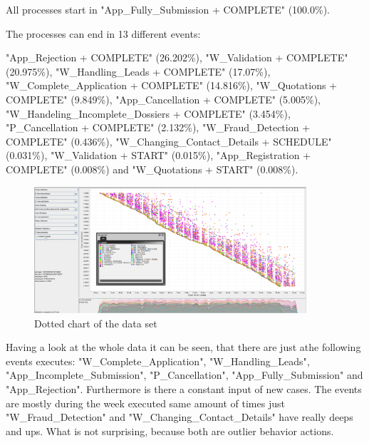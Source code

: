 All processes start in "App\_Fully\_Submission + COMPLETE" (100.0\%).

The processes can end in 13 different events:

"App\_Rejection + COMPLETE" (26.202\%), "W\_Validation + COMPLETE" (20.975\%), "W\_Handling\_Leads + COMPLETE" (17.07\%), "W\_Complete\_Application + COMPLETE" (14.816\%), "W\_Quotations + COMPLETE" (9.849\%), "App\_Cancellation + COMPLETE" (5.005\%), "W\_Handeling\_Incomplete\_Dossiers + COMPLETE" (3.454\%), "P\_Cancellation + COMPLETE" (2.132\%), "W\_Fraud\_Detection + COMPLETE" (0.436\%), "W\_Changing\_Contact\_Details + SCHEDULE" (0.031\%), "W\_Validation + START" (0.015\%), "App\_Registration + COMPLETE" (0.008\%) and "W\_Quotations + START" (0.008\%).


\begin{figure}[!htbp]
\centering
\includegraphics[width = 0.9\textwidth]{TotalDataDot.PNG}
\caption{Dotted chart of the data set}
\label{fig:WholeDat}
\end{figure}

Having a look at the whole data it can be seen, that there are just athe following events executes: "W\_Complete\_Application", "W\_Handling\_Leads", "App\_Incomplete\_Submission", "P\_Cancellation", "App\_Fully\_Submission" and "App\_Rejection". Furthermore is there a constant input of new cases. The events are mostly during the week executed same amount of times just "W\_Fraud\_Detection" and "W\_Changing\_Contact\_Details" have really deeps and ups. What is not surprising, because both are outlier behavior actions.